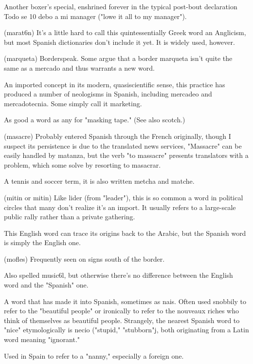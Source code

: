  Another boxer's special, enshrined forever in the
typical post-bout declaration Todo se 10 debo a mi manager ("lowe it
all to my manager").

 (marat6n) It's a little hard to call this quintessentially Greek word an Anglicism, but most Spanish dictionaries
don't include it yet. It is widely used, however.

 (marqueta) Borderspeak. Some argue that a border
marqueta isn't quite the same as a mercado and thus warrants a
new word.

 An imported concept in its modern, quasiscientific sense, this practice has produced a number of neologisms
in Spanish, including mercadeo and mercadotecnia. Some simply call
it marketing.

 As good a word as any for "masking tape." (See
also scotch.)

 (masacre) Probably entered Spanish through the
French originally, though I suspect its persistence is due to the translated news services, "Massacre" can be easily handled by matanza, but
the verb "to massacre" presents translators with a problem, which
some solve by resorting to masacrar.

 A tennis and soccer term, it is also written metcha
and matche.

 (mitin or mitin) Like lider (from "leader"), this is
so common a word in political circles that many don't realize it's an
import. It usually refers to a large-scale public rally rather than a private gathering.

 This English word can trace its origins back to the
Arabic, but the Spanish word is simply the English one.

 (mofles) Frequently seen on signs south of the
border.

 Also spelled music6l, but otherwise there's no
difference between the English word and the "Spanish" one.

 A word that has made it into Spanish, sometimes as
nais. Often used snobbily to refer to the "beautiful people" or ironically to refer to the nouveaux riches who think of themselves as beautiful people. Strangely, the nearest Spanish word to "nice" etymologically is necio ("stupid," "stubborn"j, both originating from a Latin
word meaning "ignorant."

 Used in Spain to refer to a "nanny," especially a foreign one.

